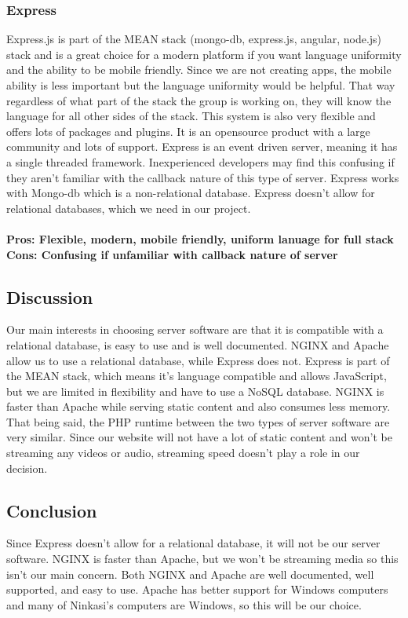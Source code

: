\documentclass[draftclsnofoot,onecolumn,letterpaper,10pt,compsoc]{IEEEtran}
\begin{document}
  			\subsubsection{Express}
				Express.js is part of the MEAN stack (mongo-db, express.js, angular, node.js) stack and is a great choice for a modern platform if you want language uniformity and the ability to be mobile friendly\cite{UpWork}.
				Since we are not creating apps, the mobile ability is less important but the language uniformity would be helpful.
				That way regardless of what part of the stack the group is working on, they will know the language for all other sides of the stack.
				This system is also very flexible and offers lots of packages and plugins.
				It is an opensource product with a large community and lots of support\cite{JSSolutionsDev}.
				Express is an event  driven server, meaning it has a single threaded framework\cite{JSSolutionsDev}.
				Inexperienced developers may find this confusing if they aren't familiar with the callback nature of this type of server\cite{JSSolutionsDev}.
				Express works with Mongo-db which is a non-relational database. Express doesn’t allow for relational databases, which we need in our project.
				\\ \\
				\textbf{Pros: Flexible, modern, mobile friendly, uniform lanuage for full stack}
				\\
				\textbf{Cons: Confusing if unfamiliar with callback nature of server}

				\subsection{Discussion}
				Our main interests in choosing server software are that it is compatible with a relational database, is easy to use and is well documented.
				NGINX and Apache allow us to use a relational database, while Express does not.
				Express is part of the MEAN stack, which means it’s language compatible and allows JavaScript, but we are limited in flexibility and have to use a NoSQL database.
				NGINX is faster than Apache while serving static content and also consumes less memory. That being said, the PHP runtime between the two types of server software are very similar\cite{HostingAd}.
				Since our website will not have a lot of static content and won’t be streaming any videos or audio, streaming speed doesn’t play a role in our decision.
				\subsection{Conclusion}
				Since Express doesn’t allow for a relational database, it will not be our server software.
				NGINX is faster than Apache, but we won’t be streaming media so this isn’t our main concern.
				Both NGINX and Apache are well documented, well supported, and easy to use.
				Apache has better support for Windows computers and many of Ninkasi’s computers are Windows, so this will be our choice.
\end{document}

